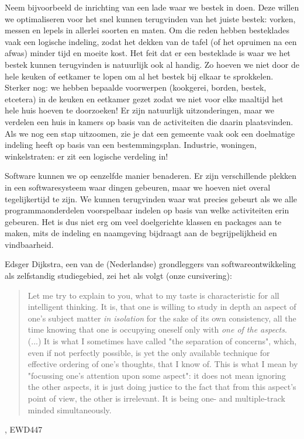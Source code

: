 Neem bijvoorbeeld de inrichting van een lade waar we bestek in doen.
Deze willen we optimaliseren voor het snel kunnen terugvinden
van het juiste bestek: vorken, messen en lepels in allerlei soorten en maten.
Om die reden hebben besteklades vaak een logische indeling, zodat 
het dekken van de tafel (of het opruimen na een afwas) minder tijd en moeite kost.
Het feit dat er een besteklade is waar we het bestek kunnen terugvinden
is natuurlijk ook al handig. Zo hoeven we niet door de hele keuken of eetkamer
te lopen om al het bestek bij elkaar te sprokkelen. 
Sterker nog: we hebben bepaalde voorwerpen (kookgerei, borden, bestek, etcetera) 
in de keuken en eetkamer gezet zodat we niet voor elke maaltijd het hele huis hoeven 
te doorzoeken! Er zijn natuurlijk uitzonderingen, maar we verdelen een huis 
in kamers op basis van de activiteiten die daarin plaatsvinden. 
Als we nog een stap uitzoomen, zie je dat een gemeente vaak ook een doelmatige
indeling heeft op basis van een bestemmingsplan. 
Industrie, woningen, winkelstraten: er zit een logische verdeling in!

Software kunnen we op eenzelfde manier benaderen.
Er zijn verschillende plekken in een softwaresysteem 
waar dingen gebeuren, maar we hoeven niet overal tegelijkertijd te zijn. 
We kunnen terugvinden waar wat precies gebeurt als we 
alle programmaonderdelen voorspelbaar indelen op basis van welke activiteiten
erin gebeuren. Het is dus niet erg om veel doelgerichte 
klassen en packages aan te maken,
mits de indeling en naamgeving bijdraagt 
aan de begrijpelijkheid en vindbaarheid.

Edsger Dijkstra, een van de (Nederlandse) grondleggers van 
softwareontwikkeling als zelfstandig studiegebied, zei het als volgt 
(onze cursivering):
\blockquote{
    Let me try to explain to you, what to my taste is characteristic for all intelligent thinking. 
    It is, that one is willing to study in depth an aspect of one's subject matter 
    \emph{in isolation} for the sake of its own consistency, 
    all the time knowing that one is occupying oneself only with \emph{one of the aspects}. 
    \newline\newline
    (...)
    \newline\newline
    It is what I sometimes have called "the separation of concerns", which, even if not perfectly possible, 
    is yet the only available technique for effective ordering of one's thoughts, 
    that I know of. This is what I mean by "focussing one's attention upon some aspect": 
    it does not mean ignoring the other aspects, it is just doing justice to the fact that 
    from this aspect's point of view, the other is irrelevant. 
    It is being one- and multiple-track minded simultaneously.
}{\cite{Dijkstra1982}, EWD447}

